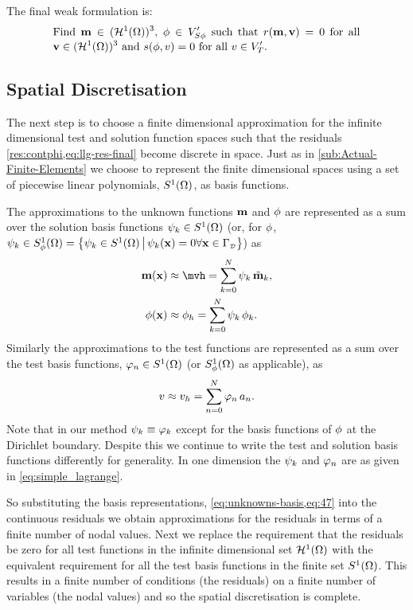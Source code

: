 The final weak formulation is:
\begin{equation}
  \eqpar{Find $\mv \in (\tsinf)^3$, $\phim \in V'_{S\phim}$ such that $\rllg(\mv, \testv) = 0$ for all $\testv \in (\tsinf)^3$ and $\rphi(\phim, \test) = 0$ for all $\test \in V'_T$.}
\label{eq:inf-dim-problem}
\end{equation}




\subsection{Spatial Discretisation}
\label{sec:spat-discr-resi}

The next step is to choose a finite dimensional approximation for the infinite dimensional test and solution function spaces such that the residuals \cref{res:contphi,eq:llg-res-final} become discrete in space.
Just as in \cref{sub:Actual-Finite-Elements} we choose to represent the finite dimensional spaces using a set of piecewise linear polynomials, $\tsbasis$, as basis functions.

The approximations to the unknown functions $\mv$ and $\phim$ are represented as a sum over the solution basis functions $\sk \in \tsbasis$ (or,  for $\phim$, $\sk \in \tsbasis[\phim] = \setst{\sk \in \tsbasis}{\sk(\xv) = 0 \forall \xv \in \boundd_\Dir}$) as
\begin{equation}
  \begin{aligned}
    \mv(\xv) &\approx \mvh = \sum_{k = 0}^{N} \sk \, \mvdis_k, \\
    \phim(\xv) &\approx \phimh = \sum_{k = 0}^{N} \sk \, \phim_{k}.
    \label{eq:unknowns-basis}
  \end{aligned}
\end{equation}
Similarly the approximations to the test functions are represented as a sum over the test basis functions, $\tn \in \tsbasis$ (or $\tsbasis[\phim]$ as applicable), as
\begin{equation}
  \label{eq:47}
  \test \approx \testh = \sum_{\ndi = 0}^{N} \tn \, a_\ndi.
\end{equation}
Note that in our method $\sbf_k \equiv \tbf_k$ except for the basis functions of  $\phim$ at the Dirichlet boundary.
Despite this we continue to write the test and solution basis functions differently for generality.
In one dimension the $\sk$ and $\tn$ are as given in \cref{eq:simple_lagrange}.

So substituting the basis representations, \cref{eq:unknowns-basis,eq:47} into the continuous residuals we obtain approximations for the residuals in terms of a finite number of nodal values.
Next we replace the requirement that the residuals be zero for all test functions in the infinite dimensional set $\tsinf$ with the equivalent requirement for all the test basis functions in the finite set $\tsbasis$.
This results in a finite number of conditions (the residuals) on a finite number of variables (the nodal values) and so the spatial discretisation is complete.

